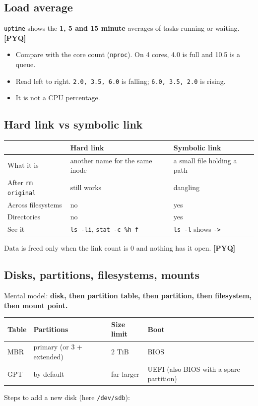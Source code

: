 \documentclass[11pt,a4paper]{article}
\newcommand{\pyq}{\textcolor{ember}{\scriptsize\textbf{[PYQ]}}}
\begin{document}
\subsection{Load average}
\texttt{uptime} shows the \textbf{1, 5 and 15 minute} averages of tasks running or waiting. \pyq{}

\begin{itemize}
\item Compare with the core count (\texttt{nproc}). On 4 cores, 4.0 is full and 10.5 is a queue.
\item Read left to right. \texttt{2.0, 3.5, 6.0} is falling; \texttt{6.0, 3.5, 2.0} is rising.
\item It is not a CPU percentage.
\end{itemize}
\subsection{Hard link vs symbolic link}
\begin{center}\small\renewcommand{\arraystretch}{1.18}\setlength{\tabcolsep}{9pt}
\begin{tabularx}{\linewidth}{@{}>{\raggedright\arraybackslash}X>{\raggedright\arraybackslash}X>{\raggedright\arraybackslash}X@{}}
\toprule
\textbf{\color{slate}} & \textbf{\color{slate}Hard link} & \textbf{\color{slate}Symbolic link} \\ \midrule
What it is & another name for the same inode & a small file holding a path \\
After \texttt{rm original} & still works & dangling \\
Across filesystems & no & yes \\
Directories & no & yes \\
See it & \texttt{ls -li}, \texttt{stat -c \%h f} & \texttt{ls -l} shows \texttt{->} \\
\bottomrule
\end{tabularx}\end{center}
Data is freed only when the link count is 0 and nothing has it open. \pyq{}

\subsection{Disks, partitions, filesystems, mounts}
Mental model: \textbf{disk, then partition table, then partition, then filesystem, then mount point.}

\begin{center}\small\renewcommand{\arraystretch}{1.18}\setlength{\tabcolsep}{9pt}
\begin{tabularx}{\linewidth}{@{}l>{\raggedright\arraybackslash}Xl>{\raggedright\arraybackslash}X@{}}
\toprule
\textbf{\color{slate}Table} & \textbf{\color{slate}Partitions} & \textbf{\color{slate}Size limit} & \textbf{\color{slate}Boot} \\ \midrule
MBR & 4 primary (or 3 + extended) & 2 TiB & BIOS \\
GPT & 128 by default & far larger & UEFI (also BIOS with a spare partition) \\
\bottomrule
\end{tabularx}\end{center}
Steps to add a new disk (here \texttt{/dev/sdb}):
\end{document}
